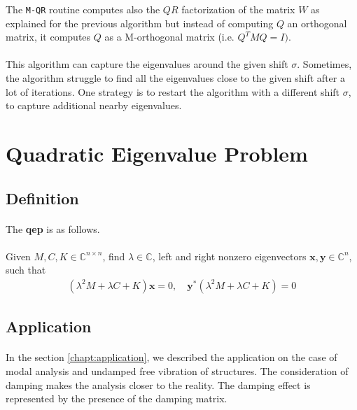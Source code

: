The \texttt{M-QR} routine computes also the $QR$ factorization of the matrix $W$ as explained for the previous algorithm  but instead of computing $Q$ an orthogonal matrix, it computes $Q$ as a M-orthogonal matrix (i.e. $Q^TMQ=I)$.

\paragraph*{}
This algorithm can capture the eigenvalues around the given shift $\sigma$. Sometimes, the algorithm struggle to find all the eigenvalues close to the given shift after a lot of iterations. One strategy is to restart the algorithm with a different shift $\sigma$, to capture additional nearby eigenvalues.




\newpage
\section{Quadratic Eigenvalue Problem}
\subsection{Definition}
\paragraph*{}
The \textbf{\acrfull{qep}} is as follows.
\paragraph*{}
Given $M,C, K \in \mathbb{C}^{n\times n}$, find $\lambda \in \mathbb{C}$, left and right nonzero eigenvectors $\mathbf{x}, \mathbf{y} \in \mathbb{C}^n$, such that
\begin{align}
    (\lambda^2 M + \lambda C + K)\mathbf{x} = 0, \quad \mathbf{y}^*(\lambda^2M + \lambda C + K) = 0
\end{align}

\subsection{Application}
\paragraph*{}
In the section \ref{chapt:application}, we described the application on the case of modal analysis and undamped free vibration of structures. The consideration of damping makes the analysis closer to the reality. The damping effect is represented by the presence of the damping matrix.

